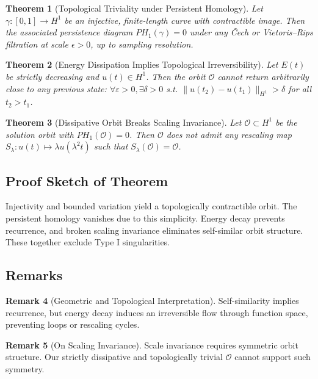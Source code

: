 \documentclass[11pt]{article}
\newtheorem{theorem}{Theorem}[section]
\theoremstyle{definition}
\newtheorem{remark}[theorem]{Remark}
\begin{document}
\begin{theorem}[Topological Triviality under Persistent Homology]
Let \( \gamma: [0,1] \to H^1 \) be an injective, finite-length curve with contractible image. Then the associated persistence diagram \( PH_1(\gamma) = 0 \) under any \v{C}ech or Vietoris--Rips filtration at scale \( \epsilon > 0 \), up to sampling resolution.
\end{theorem}

\begin{theorem}[Energy Dissipation Implies Topological Irreversibility]
Let \( E(t) \) be strictly decreasing and \( u(t) \in H^1 \). Then the orbit \( \mathcal{O} \) cannot return arbitrarily close to any previous state: \( \forall \varepsilon > 0, \exists \delta > 0 \) s.t. \( \|u(t_2) - u(t_1)\|_{H^1} > \delta \) for all \( t_2 > t_1 \).
\end{theorem}

\begin{theorem}[Dissipative Orbit Breaks Scaling Invariance]
Let \( \mathcal{O} \subset H^1 \) be the solution orbit with \( PH_1(\mathcal{O}) = 0 \). Then \( \mathcal{O} \) does not admit any rescaling map \( S_\lambda: u(t) \mapsto \lambda u(\lambda^2 t) \) such that \( S_\lambda(\mathcal{O}) = \mathcal{O} \).
\end{theorem}

\subsection*{Proof Sketch of Theorem}
Injectivity and bounded variation yield a topologically contractible orbit. The persistent homology vanishes due to this simplicity. Energy decay prevents recurrence, and broken scaling invariance eliminates self-similar orbit structure. These together exclude Type I singularities.

\subsection*{Remarks}
\begin{remark}[Geometric and Topological Interpretation]
Self-similarity implies recurrence, but energy decay induces an irreversible flow through function space, preventing loops or rescaling cycles.
\end{remark}

\begin{remark}[On Scaling Invariance]
Scale invariance requires symmetric orbit structure. Our strictly dissipative and topologically trivial \( \mathcal{O} \) cannot support such symmetry.
\end{remark}
\end{document}
